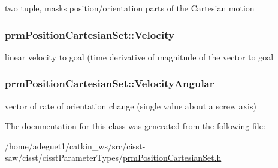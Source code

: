 two tuple, masks position/orientation parts of the Cartesian motion \hypertarget{classprm_position_cartesian_set_a218381fcba3a988483998be35d62e855}{
\subsubsection[{Velocity}]{ prm\-Position\-Cartesian\-Set\-::\-Velocity\hspace{0.3cm}{\ttfamily [protected]}}}\label{classprm_position_cartesian_set_a218381fcba3a988483998be35d62e855}
linear velocity to goal (time derivative of magnitude of the vector to goal \hypertarget{classprm_position_cartesian_set_a3dc6dc353b6f68440b1784352aba06d9}{
\subsubsection[{Velocity\-Angular}]{ prm\-Position\-Cartesian\-Set\-::\-Velocity\-Angular\hspace{0.3cm}{\ttfamily [protected]}}}\label{classprm_position_cartesian_set_a3dc6dc353b6f68440b1784352aba06d9}
vector of rate of orientation change (single value about a screw axis) 

The documentation for this class was generated from the following file\-:\begin{DoxyCompactItemize}
\item 
/home/adeguet1/catkin\-\_\-ws/src/cisst-\/saw/cisst/cisst\-Parameter\-Types/\hyperlink{prm_position_cartesian_set_8h}{prm\-Position\-Cartesian\-Set.\-h}\end{DoxyCompactItemize}
